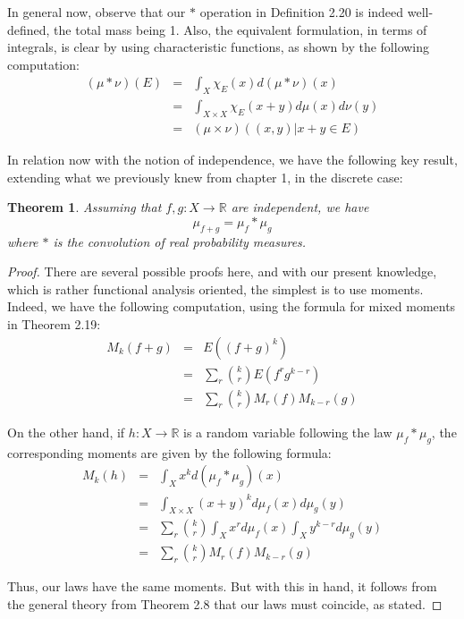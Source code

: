 \documentclass[12pt]{amsbook}
\newtheorem{theorem}{Theorem}[chapter]
\begin{document}
In general now, observe that our $*$ operation in Definition 2.20 is indeed well-defined, the total mass being 1. Also, the equivalent formulation, in terms of integrals, is clear by using characteristic functions, as shown by the following computation:
\begin{eqnarray*}
(\mu*\nu)(E)
&=&\int_X\chi_E(x)d(\mu*\nu)(x)\\
&=&\int_{X\times X}\chi_E(x+y)d\mu(x)d\nu(y)\\
&=&(\mu\times\nu)\left((x,y)\Big|x+y\in E\right)
\end{eqnarray*}

In relation now with the notion of independence, we have the following key result, extending what we previously knew from chapter 1, in the discrete case:

\begin{theorem}
Assuming that $f,g:X\to\mathbb R$ are independent, we have
$$\mu_{f+g}=\mu_f*\mu_g$$
where $*$ is the convolution of real probability measures.
\end{theorem}

\begin{proof}
There are several possible proofs here, and with our present knowledge, which is rather functional analysis oriented, the simplest is to use moments. Indeed, we have the following computation, using the formula for mixed moments in Theorem 2.19:
\begin{eqnarray*}
M_k(f+g)
&=&E((f+g)^k)\\
&=&\sum_r\binom{k}{r}E(f^rg^{k-r})\\
&=&\sum_r\binom{k}{r}M_r(f)M_{k-r}(g)
\end{eqnarray*}

On the other hand, if $h:X\to\mathbb R$ is a random variable following the law $\mu_f*\mu_g$, the corresponding moments are given by the following formula:
\begin{eqnarray*}
M_k(h)
&=&\int_Xx^kd(\mu_f*\mu_g)(x)\\
&=&\int_{X\times X}(x+y)^kd\mu_f(x)d\mu_g(y)\\
&=&\sum_r\binom{k}{r}\int_Xx^rd\mu_f(x)\int_Xy^{k-r}d\mu_g(y)\\
&=&\sum_r\binom{k}{r}M_r(f)M_{k-r}(g)
\end{eqnarray*}

Thus, our laws have the same moments. But with this in hand, it follows from the general theory from Theorem 2.8 that our laws must coincide, as stated.
\end{proof}
\end{document}
